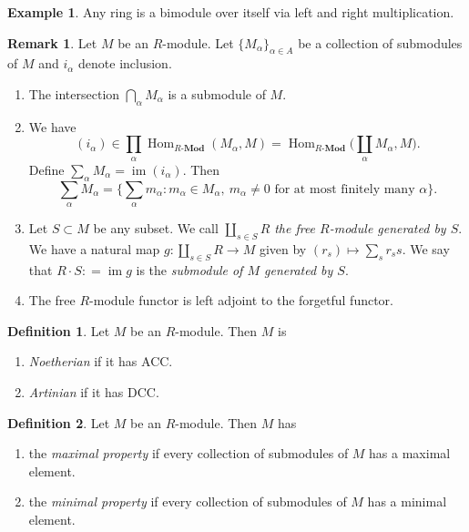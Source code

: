 \documentclass[10pt,letterpaper,cm]{nupset}
\theoremstyle{definition}
\newtheorem*{definition}{Definition}
\newtheorem{exmp}{Example}
\newtheorem{remark}{Remark}
\newcommand{\1}{\mathbf{1}}
\newcommand{\0}{\vec 0}
\DeclareMathOperator{\im}{im}
\DeclareMathOperator{\Hom}{Hom}
\begin{document}
\begin{exmp}
Any ring is a bimodule over itself via left and right multiplication.
\end{exmp}

\begin{remark} Let $M$ be an $R$-module. Let $\{M_{\alpha}\}_{\alpha \in A}$ be a collection of submodules of $M$ and $i_{\alpha}$ denote inclusion.
\begin{enumerate}
\item The intersection $\bigcap_{\alpha} M_{\alpha}$ is a submodule of $M$. 
\item We have $$(i_{\alpha}) \in \prod_{\alpha}\Hom_{R\text{-}\mathbf{Mod}}(M_{\alpha}, M) = \Hom_{R\text{-}\mathbf{Mod}}\big (\coprod_{\alpha} M_{\alpha}, M\big ).$$ Define $\sum_{\alpha} M_{\alpha} = \im (i_{\alpha})$. Then $$\sum_{\alpha} M_{\alpha}  = \{\sum_{\alpha} m_{\alpha} : m_{\alpha} \in M_{\alpha}, \ m_{\alpha} \ne 0 \text{ for at most finitely many } \alpha\}.$$
\item Let $S\subset M$ be any subset. We call $\coprod_{s\in S} R$ \textit{the free $R$-module generated by $S$}. We have a natural map $g : \coprod_{s\in S} R \to M$ given by $(r_s) \mapsto \sum_s r_ss$. We say that $R \cdot S: = \im g$ is the \textit{submodule of $M$ generated by $S$}.
\item The free $R$-module functor is left adjoint to the forgetful functor.
\end{enumerate}
\end{remark}

\begin{definition} Let $M$ be an $R$-module. Then $M$ is
\begin{enumerate}
\item \textit{Noetherian} if it has ACC.
\item \textit{Artinian} if it has DCC.
\end{enumerate}
\end{definition}

\begin{definition} Let $M$ be an $R$-module. Then $M$ has
\begin{enumerate}
\item the \textit{maximal property} if every collection of submodules of $M$ has a maximal element.
\item the \textit{minimal property} if every collection of submodules of $M$ has a minimal element.
\end{enumerate}
\end{definition}
\end{document}
